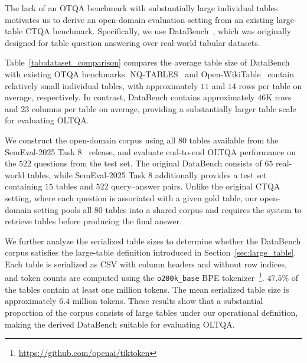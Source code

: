 The lack of an OTQA benchmark with substantially large individual tables motivates us to derive an open-domain evaluation setting from an existing large-table CTQA benchmark.
Specifically, we use DataBench~\cite{databench}, which was originally designed for table question answering over real-world tabular datasets.

Table~\ref{tab:dataset_comparison} compares the average table size of DataBench with existing OTQA benchmarks.
NQ-TABLES~\cite{nqtables} and Open-WikiTable~\cite{openwikitable} contain relatively small individual tables, with approximately $11$ and $14$ rows per table on average, respectively.
In contrast, DataBench contains approximately $46$K rows and $23$ columns per table on average, providing a substantially larger table scale for evaluating OLTQA.

We construct the open-domain corpus using all $80$ tables available from the SemEval-2025 Task 8~\cite{semeval2025task8} release, and evaluate end-to-end OLTQA performance on the $522$ questions from the test set.
The original DataBench consists of $65$ real-world tables, while SemEval-2025 Task 8 additionally provides a test set containing $15$ tables and $522$ query--answer pairs.
Unlike the original CTQA setting, where each question is associated with a given gold table, our open-domain setting pools all $80$ tables into a shared corpus and requires the system to retrieve tables before producing the final answer.

We further analyze the serialized table sizes to determine whether the DataBench corpus satisfies the large-table definition introduced in Section~\ref{sec:large_table}.
Each table is serialized as CSV with column headers and without row indices, and token counts are computed using the \texttt{o200k\_base} BPE tokenizer~\footnote{\url{https://github.com/openai/tiktoken}}.
$47.5\%$ of the tables contain at least one million tokens.
The mean serialized table size is approximately $6.4$ million tokens.
These results show that a substantial proportion of the corpus consists of large tables under our operational definition, making the derived DataBench suitable for evaluating OLTQA.

